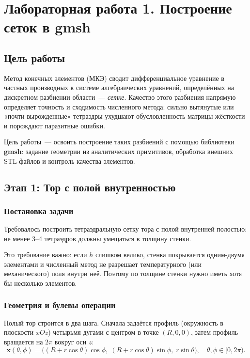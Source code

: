 \section{Лабораторная работа \textnumero{}1. Построение сеток в gmsh}

\subsection{Цель работы}

Метод конечных элементов (МКЭ) сводит дифференциальное уравнение
в частных производных к системе алгебраических уравнений, определённых
на дискретном разбиении области~--- \textit{сетке}. Качество этого
разбиения напрямую определяет точность и сходимость численного метода:
сильно вытянутые или «почти вырожденные» тетраэдры ухудшают обусловленность
матрицы жёсткости и порождают паразитные ошибки.

Цель работы~--- освоить построение таких разбиений с помощью библиотеки
\textbf{gmsh}: задание геометрии из аналитических примитивов, обработка
внешних STL-файлов и контроль качества элементов.

\subsection{Этап 1: Тор с полой внутренностью}

\subsubsection{Постановка задачи}

Требовалось построить тетраэдральную сетку тора с полой внутренней
полостью: не менее 3--4 тетраэдров должны умещаться в толщину стенки.

Это требование важно: если $h$ слишком велико, стенка
покрывается одним-двумя элементами и численный метод не разрешает
температурного (или механического) поля внутри неё. Поэтому по толщине
стенки нужно иметь хотя бы несколько элементов.

\subsubsection{Геометрия и булевы операции}

Полый тор строится в два шага. Сначала задаётся профиль (окружность
в плоскости $xOz$) четырьмя дугами с центром в точке $(R, 0, 0)$,
затем профиль вращается на $2\pi$ вокруг оси $z$:
\begin{equation}
  \mathbf{x}(\theta, \phi) =
  \bigl((R + r\cos\theta)\cos\phi,\;
         (R + r\cos\theta)\sin\phi,\;
         r\sin\theta\bigr),
  \quad \theta,\phi \in [0, 2\pi).
\end{equation}

